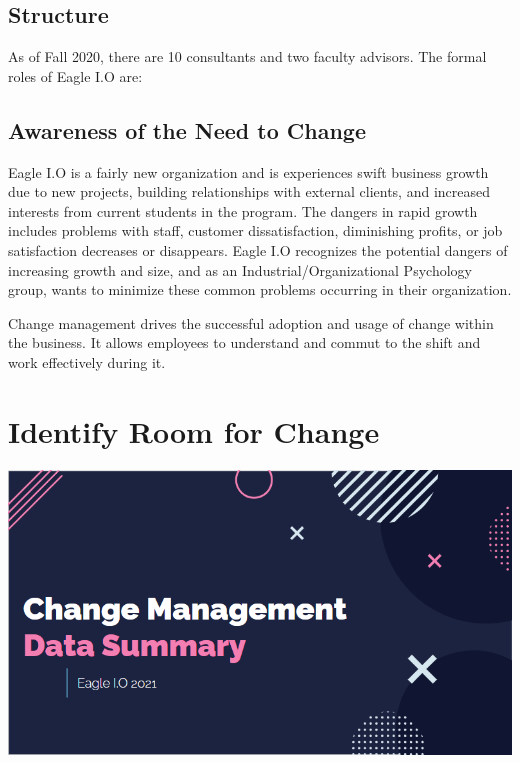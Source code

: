 \documentclass[
]{book}
\begin{document}
\hypertarget{structure}{%
\section{Structure}\label{structure}}

As of Fall 2020, there are 10 consultants and two faculty advisors. The formal roles of Eagle I.O are:

\hypertarget{awareness-of-the-need-to-change}{%
\section{Awareness of the Need to Change}\label{awareness-of-the-need-to-change}}

Eagle I.O is a fairly new organization and is experiences swift business growth due to new projects, building relationships with external clients, and increased interests from current students in the program. The dangers in rapid growth includes problems with staff, customer dissatisfaction, diminishing profits, or job satisfaction decreases or disappears. Eagle I.O recognizes the potential dangers of increasing growth and size, and as an Industrial/Organizational Psychology group, wants to minimize these common problems occurring in their organization.

Change management drives the successful adoption and usage of change within the business. It allows employees to understand and commut to the shift and work effectively during it.

\hypertarget{identify-room-for-change}{%
\chapter{Identify Room for Change}\label{identify-room-for-change}}

\href{https://docs.google.com/presentation/d/1xHzS2NwHKtD-nlJDryFGpQIgfIarGMMdZX8hyrCwMlI/edit?usp=sharing}{\includegraphics{PPT.PNG}}
\end{document}
